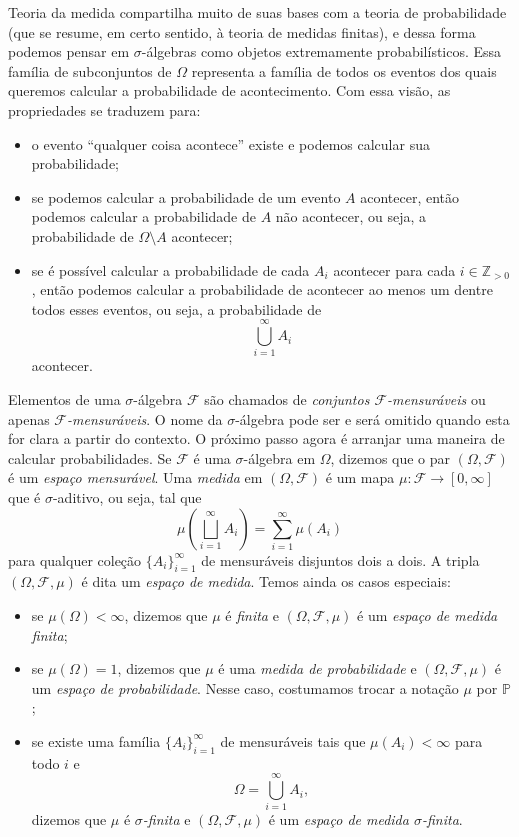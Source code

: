 \documentclass{article}
\begin{document}
Teoria da medida compartilha muito de suas bases com a teoria de probabilidade (que se resume, em certo sentido, à teoria de medidas finitas), e dessa forma podemos pensar em $\sigma$-álgebras como objetos extremamente probabilísticos. Essa família de subconjuntos de $\Omega$ representa a família de todos os eventos dos quais queremos calcular a probabilidade de acontecimento. Com essa visão, as propriedades se traduzem para: \begin{itemize}
    \item o evento ``qualquer coisa acontece'' existe e podemos calcular sua probabilidade;
    \item se podemos calcular a probabilidade de um evento $A$ acontecer, então podemos calcular a probabilidade de $A$ não acontecer, ou seja, a probabilidade de $\Omega \setminus A$ acontecer;
    \item se é possível calcular a probabilidade de cada $A_i$ acontecer para cada $i \in \mathbb{Z}_{>0}$, então podemos calcular a probabilidade de acontecer ao menos um dentre todos esses eventos, ou seja, a probabilidade de $$\bigcup_{i = 1}^\infty A_i$$ acontecer.
\end{itemize}

Elementos de uma $\sigma$-álgebra $\mathcal{F}$ são chamados de \textit{conjuntos $\mathcal{F}$-mensuráveis} ou apenas \textit{$\mathcal{F}$-mensuráveis}. O nome da $\sigma$-álgebra pode ser e será omitido quando esta for clara a partir do contexto. O próximo passo agora é arranjar uma maneira de calcular probabilidades. Se $\mathcal{F}$ é uma $\sigma$-álgebra em $\Omega$, dizemos que o par $(\Omega, \mathcal{F})$ é um \textit{espaço mensurável}. Uma \textit{medida} em $(\Omega, \mathcal{F})$ é um mapa $\mu \colon \mathcal{F} \to [0, \infty]$ que é $\sigma$-aditivo, ou seja, tal que $$\mu\left(\bigsqcup_{i = 1}^\infty A_i\right) = \sum_{i = 1}^\infty \mu(A_i)$$ para qualquer coleção $\{A_i\}_{i = 1}^\infty$ de mensuráveis disjuntos dois a dois. A tripla $(\Omega, \mathcal{F}, \mu)$ é dita um \textit{espaço de medida}. Temos ainda os casos especiais: \begin{itemize}
    \item se $\mu(\Omega) < \infty$, dizemos que $\mu$ é \textit{finita} e $(\Omega, \mathcal{F}, \mu)$ é um \textit{espaço de medida finita};
    \item se $\mu(\Omega) = 1$, dizemos que $\mu$ é uma \textit{medida de probabilidade} e $(\Omega, \mathcal{F}, \mu)$ é um \textit{espaço de probabilidade}. Nesse caso, costumamos trocar a notação $\mu$ por $\mathbb{P}$;
    \item se existe uma família $\{A_i\}_{i = 1}^\infty$ de mensuráveis tais que $\mu(A_i) < \infty$ para todo $i$ e $$\Omega = \bigcup_{i = 1}^\infty A_i,$$ dizemos que $\mu$ é \textit{$\sigma$-finita} e $(\Omega, \mathcal{F}, \mu)$ é um \textit{espaço de medida $\sigma$-finita}.
\end{itemize}
\end{document}
